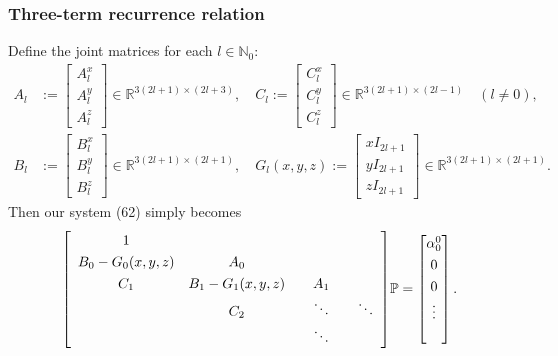 \documentclass[10pt]{beamer}
\newcommand{\R}{\mathbb{R}}
\newcommand{\No}{\mathbb{N}_0}
\newcommand{\bigP}{\mathbb{P}}
\begin{document}
\frame
{
    \frametitle{Three-term recurrence relation}

Define the joint matrices for each \(l \in \No\):
\begin{align}
A_l &:= \begin{bmatrix}
		A^x_l \\
		A^y_l \\
		A^z_l
	    \end{bmatrix} \in \R^{3(2l+1)\times(2l+3)}, \quad
C_l := \begin{bmatrix}
		C^x_l \\
		C^y_l \\
		C^z_l
	    \end{bmatrix} \in \R^{3(2l+1)\times(2l-1)} \quad (l \ne 0), \\
B_l &:= \begin{bmatrix}
		B^x_l \\
		B^y_l \\
		B^z_l
	    \end{bmatrix} \in \R^{3(2l+1)\times(2l+1)}, \quad
G_l(x,y,z) := \begin{bmatrix}
		xI_{2l+1} \\
		yI_{2l+1} \\
		zI_{2l+1}
	    \end{bmatrix} \in \R^{3(2l+1)\times(2l+1)}.
\end{align}
Then our system (62) simply becomes
\begin{align}
\renewcommand\arraystretch{1.3}
\mleft[
\begin{array}{cccc}
		1  & & & \\
		B_0-G_0(x,y,z) & A_0 & & \\
		C_1 & B_1-G_1(x,y,z) & \quad A_1 \quad & \\
		& C_2 & \ddots & \ddots \\
		& & \ddots &
\end{array}
\mright]
\bigP
=
\begin{bmatrix}
	\alpha^0_0 \\ 0 \\ 0 \\ \vdots \\ \\
\end{bmatrix}.
\end{align}

}
\end{document}
